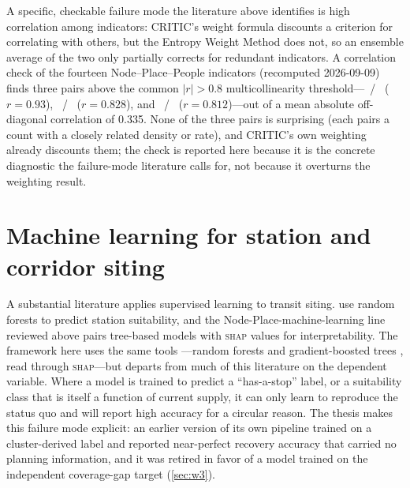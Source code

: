 A specific, checkable failure mode the literature above identifies is high correlation
among indicators: CRITIC's weight formula discounts a criterion for correlating with
others, but the Entropy Weight Method does not, so an ensemble average of the two only
partially corrects for redundant indicators. A correlation check of the fourteen
Node--Place--People indicators (recomputed 2026-09-09) finds three pairs above the common
$|r|>0.8$ multicollinearity threshold---~/~ ($r=0.93$), ~/~
($r=0.828$), and ~/~ ($r=0.812$)---out
of a mean absolute off-diagonal correlation of \num{0.335}. None of the three pairs is
surprising (each pairs a count with a closely related density or rate), and CRITIC's own
weighting already discounts them; the check is reported here because it is the concrete
diagnostic the failure-mode literature calls for, not because it overturns the weighting
result.

\section{Machine learning for station and corridor siting}
\label{sec:lit-ml}

A substantial literature applies supervised learning to transit siting.
\textcite{niu2023rf} use random forests to predict station suitability, and the
Node-Place-machine-learning line reviewed above \parencite{su2022nodeplace,
aminipishro2022nprt} pairs tree-based models with \textsc{shap} values
\parencite{lundberg2017shap} for interpretability. The framework here uses the same tools
---random forests \parencite{breiman2001rf} and gradient-boosted trees
\parencite{chen2016xgboost, ke2017lightgbm}, read through \textsc{shap}---but
departs from much of this literature on the dependent variable. Where a model is trained
to predict a ``has-a-stop'' label, or a suitability class that is itself a function of
current supply, it can only learn to reproduce the status quo and will report high
accuracy for a circular reason. The thesis makes this failure mode explicit: an earlier
version of its own pipeline trained on a cluster-derived label and reported near-perfect
recovery accuracy that carried no planning information, and it was retired in favor of a
model trained on the independent coverage-gap target (\cref{sec:w3}).

